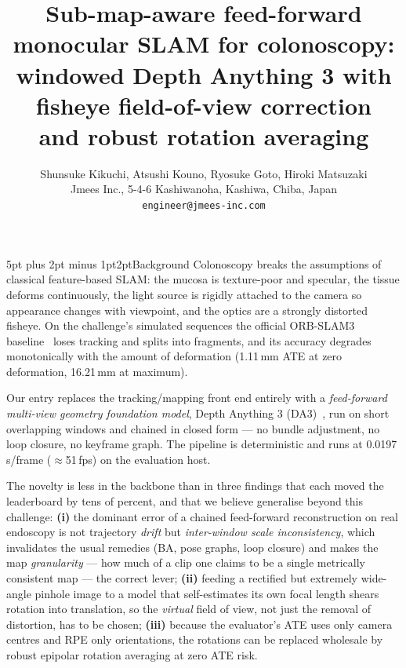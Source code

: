 \documentclass[10pt,a4paper]{article}
\title{\vspace{-1.4cm}\bfseries Sub-map-aware feed-forward monocular SLAM for colonoscopy:\\
windowed Depth Anything 3 with fisheye field-of-view correction\\ and robust rotation averaging}
\author{Shunsuke Kikuchi, Atsushi Kouno, Ryosuke Goto, Hiroki Matsuzaki\\[1pt]
\small Jmees Inc., 5\mbox{-}4\mbox{-}6 Kashiwanoha, Kashiwa, Chiba, Japan\\
\small\texttt{engineer@jmees-inc.com}}
\date{}
\makeatletter
\renewcommand\section{\@startsection{section}{1}{\z@}%
  {5pt plus 2pt minus 1pt}{2pt}{\normalfont\large\bfseries}}
\makeatother
\begin{document}
\maketitle
\vspace{-1.0cm}

\noindent{}

\section{Background}
Colonoscopy breaks the assumptions of classical feature-based SLAM: the mucosa is texture-poor and
specular, the tissue deforms continuously, the light source is rigidly attached to the camera so
appearance changes with viewpoint, and the optics are a strongly distorted fisheye. On the
challenge's simulated sequences the official ORB-SLAM3 baseline~\cite{orbslam3} loses tracking and splits into
fragments, and its accuracy degrades monotonically with the amount of deformation
(1.11\,mm ATE at zero deformation, 16.21\,mm at maximum).

Our entry replaces the tracking/mapping front end entirely with a \emph{feed-forward multi-view
geometry foundation model}, Depth Anything 3 (DA3)~\cite{da3}, run on short overlapping windows and
chained in closed form --- no bundle adjustment, no loop closure, no keyframe graph. The pipeline is
deterministic and runs at 0.0197\,s/frame ($\approx$51\,fps) on the evaluation host.

The novelty is less in the backbone than in three findings that each moved the leaderboard by tens of
percent, and that we believe generalise beyond this challenge:
\textbf{(i)} the dominant error of a chained feed-forward reconstruction on real endoscopy is not
trajectory \emph{drift} but \emph{inter-window scale inconsistency}, which invalidates the usual
remedies (BA, pose graphs, loop closure) and makes the map \emph{granularity} --- how much of a clip
one claims to be a single metrically consistent map --- the correct lever;
\textbf{(ii)} feeding a rectified but extremely wide-angle pinhole image to a model that
self-estimates its own focal length shears rotation into translation, so the \emph{virtual}
field of view, not just the removal of distortion, has to be chosen;
\textbf{(iii)} because the evaluator's ATE uses only camera centres and RPE only orientations, the
rotations can be replaced wholesale by robust epipolar rotation averaging at zero ATE risk.
\end{document}
